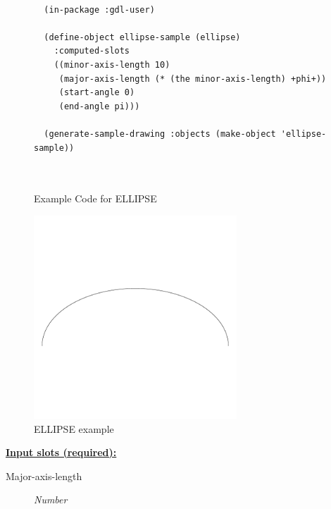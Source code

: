 \documentclass [11pt]{book}
\begin{document}
\begin{itemize}
\begin{figure}
\begin{lrbox}{\boxedverb}
\begin{minipage}{\linewidth}
{\begin{verbatim}
  
  (in-package :gdl-user)

  (define-object ellipse-sample (ellipse)
    :computed-slots
    ((minor-axis-length 10)
     (major-axis-length (* (the minor-axis-length) +phi+))
     (start-angle 0)
     (end-angle pi)))

  (generate-sample-drawing :objects (make-object 'ellipse-sample))
  
  
\end{verbatim}}
\end{minipage}
\end{lrbox}
\fbox{\usebox{\boxedverb}}

\caption{Example Code for ELLIPSE}

\label{fig:example-code-ELLIPSE}

\end{figure}

\begin{figure}
\begin{center}
\includegraphics[width=3in,height=3in]{../images/example-ellipse.pdf}
\end{center}

\caption{ELLIPSE example}

\label{fig:ELLIPSE}

\end{figure}





\textbf{
\underline{Input slots (required):}}

\begin{description}

\item [Major-axis-length]
\emph{Number}


\end{description}
\end{itemize}
\end{document}

